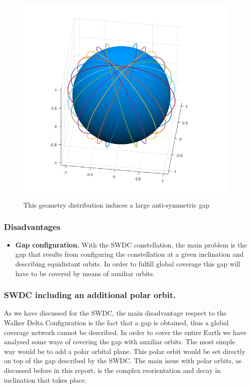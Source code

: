 \begin{figure}[h]
\includegraphics[width=12cm]{semiwalker12}
\centering
\caption{This geometry distribution induces a large anti-symmetric gap}
\end{figure}

\subsubsection{Disadvantages}
\begin{itemize}[label={--}]
\item\textbf{Gap configuration.} With the SWDC constellation, the main problem is the gap that results from configuring the constellation at a given inclination and describing equidistant orbits. In order to fulfill global coverage this gap will have to be covered by means of auxiliar orbits.
\end{itemize}

\subsubsection{SWDC including an additional polar orbit.}
As we have discussed for the SWDC, the main disadvantage respect to the Walker Delta Configuration is the fact that a gap is obtained, thus a global coverage network cannot be described. In order to cover the entire Earth we have analysed some ways of covering the gap with auxiliar orbits.
\newline
The most simple way would be to add a polar orbital plane. This polar orbit would be set directly on top of the gap described by the SWDC. The main issue with polar orbits, as discussed before in this report, is the complex reorientation and decay in inclination that takes place.

